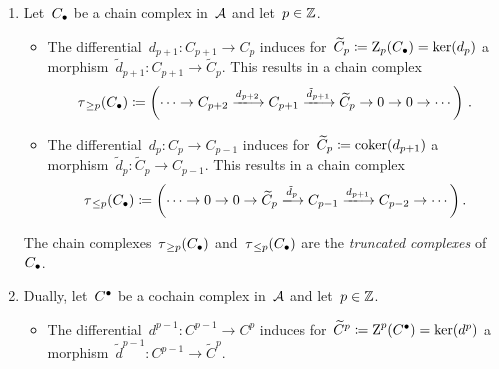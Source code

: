 \begin{remarkdefinition}
  \leavevmode
  \begin{enumerate}
    \item
      Let~$C_\bullet$ be a chain complex in~$\mathcal{A}$ and let~$p \in \mathbb{Z}$.
      \begin{itemize}
        \item
          The differential~$d_{p+1} \colon C_{p+1} \to C_p$ induces for~$\widetilde{C}_p \coloneqq \operatorname{Z}_p(C_\bullet) = \ker(d_p)$ a morphism~$\tilde{d}_{p+1} \colon C_{p+1} \to \widetilde{C}_p$.
          This results in a chain complex
          \[
                      \tau_{\,\geq p}(\Ccc)
            \defined  \left(
                        \dotsb
                        \to
                        C_{p+2}
                        \xlongto{d_{p+2}}
                        C_{p+1}
                        \xlongto{\tilde{d}_{p+1}}
                        \widetilde{C}_p
                        \to
                        0
                        \to
                        0
                        \to
                        \dotsb
                      \right) \,.
          \]
        \item
          The differential~$d_p \colon C_p \to C_{p-1}$ induces for~$\widetilde{C}_p \coloneqq \operatorname{coker}(d_{p+1})$ a morphism~$\tilde{d}_p \colon \tilde{C}_p \to C_{p-1}$.
          This results in a chain complex
          \[
                      \tau_{\,\leq p}(\Ccc)
            \defined  \left(
                        \dotsb
                        \to
                        0
                        \to
                        0
                        \to
                        \widetilde{C}_p
                        \xlongto{\tilde{d}_p}
                        C_{p-1}
                        \xlongto{d_{p+1}}
                        C_{p-2}
                        \to
                        \dotsb
                      \right).
          \]
        \end{itemize}
        The chain complexes~$\tau_{\,\geq p}(C_\bullet)$ and~$\tau_{\,\leq p}(C_\bullet)$ are the \emph{truncated complexes} of~$C_\bullet$.
      \item
        Dually, let~$C^\bullet$ be a cochain complex in~$\mathcal{A}$ and let~$p \in \mathbb{Z}$.
      \begin{itemize}
        \item
          The differential~$d^{p-1} \colon C^{p-1} \to C^p$ induces for~$\widetilde{C}^p \coloneqq \operatorname{Z}^p(C^\bullet) = \ker(d^p)$ a morphism~$\tilde{d}^{p-1} \colon C^{p-1} \to \widetilde{C}^p$.

\end{itemize}
\end{enumerate}
\end{remarkdefinition}
